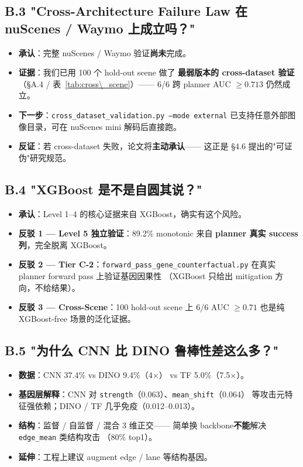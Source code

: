 \documentclass[a4paper,12pt,fontset=fandol]{ctexart}
\newcommand{\gene}[1]{\texttt{#1}}
\begin{document}
{\subsection*{B.3 "Cross-Architecture Failure Law 在 nuScenes / Waymo 上成立吗？"}

\begin{itemize}[leftmargin=*]
\item \textbf{承认}：完整 nuScenes / Waymo 验证\textbf{尚未}完成。
\item \textbf{证据}：我们已用 100 个 hold-out scene 做了
      \textbf{最弱版本的 cross-dataset 验证}（§A.4 / 表~\ref{tab:cross\_scene}）——
      6/6 跨 planner AUC $\geq 0.713$ 仍然成立。
\item \textbf{下一步}：\texttt{cross\_dataset\_validation.py --mode external}
      已支持任意外部图像目录，可在 nuScenes mini 解码后直接跑。
\item \textbf{反证}：若 cross-dataset 失败，论文将\textbf{主动承认}——
      这正是 §4.6 提出的"可证伪"研究规范。
\end{itemize}

\subsection*{B.4 "XGBoost 是不是自圆其说？"}

\begin{itemize}[leftmargin=*]
\item \textbf{承认}：Level 1--4 的核心证据来自 XGBoost，确实有这个风险。
\item \textbf{反驳 1 — Level 5 独立验证}：89.2\% monotonic 来自
      \textbf{planner 真实 success 列}，完全脱离 XGBoost。
\item \textbf{反驳 2 — Tier C-2}：\texttt{forward\_pass\_gene\_counterfactual.py}
      在真实 planner forward pass 上验证基因因果性
      （XGBoost 只给出 mitigation 方向，不给结果）。
\item \textbf{反驳 3 — Cross-Scene}：100 hold-out scene 上 6/6 AUC
      $\geq 0.71$ 也是纯 XGBoost-free 场景的泛化证据。
\end{itemize}

\subsection*{B.5 "为什么 CNN 比 DINO 鲁棒性差这么多？"}

\begin{itemize}[leftmargin=*]
\item \textbf{数据}：CNN 37.4\% vs DINO 9.4\%（4$\times$） vs TF 5.0\%（7.5$\times$）。
\item \textbf{基因层解释}：CNN 对 \gene{strength}（0.063）、\gene{mean\_shift}（0.064）
      等攻击元特征强依赖；DINO / TF 几乎免疫（0.012--0.013）。
\item \textbf{结构}：监督 / 自监督 / 混合 3 维正交——
      简单换 backbone\textbf{不能}解决 \gene{edge\_mean} 类结构攻击
      （80\% top1）。
\item \textbf{延伸}：工程上建议 augment edge / lane 等结构基因。
\end{itemize}

}
\end{document}
